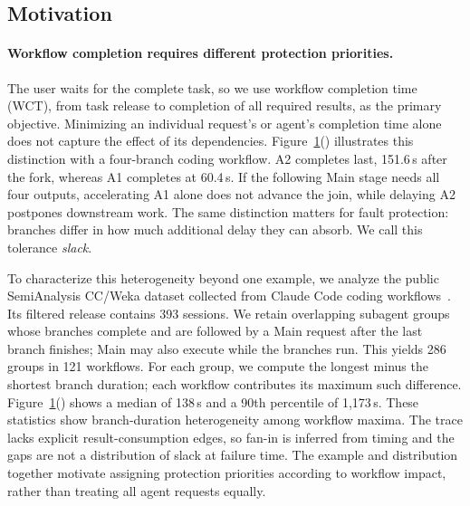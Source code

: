 \begin{figure}[t]
  \label{fig:motivation}
\end{figure}

\subsection{Motivation}

\paragraph{Workflow completion requires different protection priorities.}
\label{sec:motivation-workflow}
The user waits for the complete task, so we use workflow completion time
(WCT), from task release to completion of all required results, as the
primary objective. Minimizing an individual request's or agent's completion
time alone does not capture the effect of its dependencies.
Figure~\ref{fig:motivation}() illustrates
this distinction with a four-branch coding workflow. A2 completes last,
151.6\,s after the fork, whereas A1 completes at 60.4\,s. If the following
Main stage needs all four outputs, accelerating A1 alone does not advance
the join, while delaying A2 postpones downstream work. The same distinction
matters for fault protection: branches differ in how much additional delay
they can absorb. We call this tolerance \emph{slack}.

To characterize this heterogeneity beyond one example, we analyze the
public SemiAnalysis CC/Weka dataset collected from Claude Code coding
workflows~\cite{semianalysis2026cctraces}. Its filtered release contains
393 sessions. We retain overlapping subagent groups whose branches
complete and are followed by a Main request after the last branch finishes;
Main may also execute while the branches run. This yields 286 groups in
121 workflows. For each group, we compute the longest minus the shortest
branch duration; each workflow contributes its maximum such difference.
Figure~\ref{fig:motivation}() shows a
median of 138\,s and a 90th percentile of 1,173\,s. These statistics show
branch-duration heterogeneity among workflow maxima. The trace lacks
explicit result-consumption edges, so fan-in is inferred from timing and
the gaps are not a distribution of slack at failure time. The example and
distribution together motivate assigning protection priorities according
to workflow impact, rather than treating all agent requests equally.

